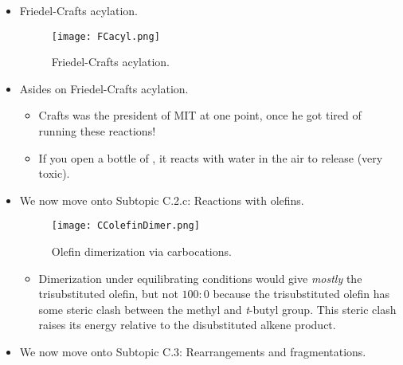\documentclass[../notes.tex]{subfiles}
\begin{document}
\begin{itemize}
\begin{figure}[H]
        \texttt{[image: Hock.png]}
        \caption{Hock process (stage 1).}
        \label{fig:Hock}
    \end{figure}
    \begin{itemize}
        \item This is the primary method of producing acetone.\footnote{You can read more about this process --- called the \textbf{Hock process} --- on \href{https://en.wikipedia.org/wiki/Cumene_process}{Wikipedia}.}
        \item It astounds Prof. Buchwald that this is economical: Indeed, it's easier to attach the isopropyl group to benzene and then rip it apart again, then it is to convert it directly to acetone.
    \end{itemize}
    \item Friedel-Crafts acylation.
    \begin{figure}[h!]
        \centering
        \texttt{[image: FCacyl.png]}
        \caption{Friedel-Crafts acylation.}
        \label{fig:FCacyl}
    \end{figure}
    \item Asides on Friedel-Crafts acylation.
    \begin{itemize}
        \item Crafts was the president of MIT at one point, once he got tired of running these reactions!
        \item If you open a bottle of , it reacts with water in the air to release  (very toxic).
    \end{itemize}
    \item We now move onto Subtopic C.2.c{}: Reactions with olefins.
    \begin{figure}[h!]
        \centering
        \texttt{[image: CColefinDimer.png]}
        \caption{Olefin dimerization via carbocations.}
        \label{fig:CColefinDimer}
    \end{figure}
    \begin{itemize}
        \item Dimerization under equilibrating conditions would give \emph{mostly} the trisubstituted olefin, but not $100:0$ because the trisubstituted olefin has some steric clash between the methyl and \emph{t}-butyl group. This steric clash raises its energy relative to the disubstituted alkene product.
    \end{itemize}
    \item We now move onto Subtopic C.3: Rearrangements and fragmentations.

\end{itemize}
\end{document}
